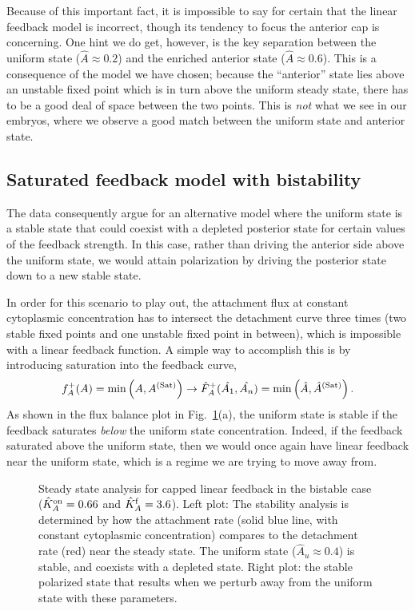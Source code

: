 \documentclass[11pt]{article}
\newcommand{\6}[1]{#1_{\text{6}}}
\newcommand{\3}[1]{#1_{\text{3}}}
\newcommand{\Sat}[1]{#1^\text{(Sat)}}
\begin{document}
Because of this important fact, it is impossible to say for certain that the linear feedback model is incorrect, though its tendency to focus the anterior cap is concerning. One hint we do get, however, is the key separation between the uniform state ($\hat A \approx 0.2$) and the enriched anterior state ($\hat A \approx 0.6$). This is a consequence of the model we have chosen; because the ``anterior'' state lies above an unstable fixed point which is in turn above the uniform steady state, there has to be a good deal of space between the two points. This is \emph{not} what we see in our embryos, where we observe a good match between the uniform state and anterior state.

\subsection{Saturated feedback model with bistability}
The data consequently argue for an alternative model where the uniform state is a stable state that could coexist with a depleted posterior state for certain values of the feedback strength. In this case, rather than driving the anterior side above the uniform state, we would attain polarization by driving the posterior state down to a new stable state. 

In order for this scenario to play out, the attachment flux at constant cytoplasmic concentration has to intersect the detachment curve three times (two stable fixed points and one unstable fixed point in between), which is impossible with a linear feedback function. A simple way to accomplish this is by introducing saturation into the feedback curve,
\begin{equation}
\label{eq:FBmodel}
f_A^+(A) =\min\left(A,\Sat{A}\right) \rightarrow \hat F_A^+(\hat \MA, \hat \PA) = \min\left(\hat A, \Sat{\hat A}\right). 
\end{equation}
As shown in the flux balance plot in Fig.\ \ref{fig:P3Cap}(a), the uniform state is stable if the feedback saturates \emph{below} the uniform state concentration. Indeed, if the feedback saturated above the uniform state, then we would once again have linear feedback near the uniform state, which is a regime we are trying to move away from.

\begin{figure}
\centering
{}
\caption{\label{fig:P3Cap}Steady state analysis for capped linear feedback in the bistable case ($\hat{K}^\text{on}_A=0.66$ and $\hat{K}^\text{f}_A=3.6$). Left plot: The stability analysis is determined by how the attachment rate (solid blue line, with constant cytoplasmic concentration) compares to the detachment rate (red) near the steady state. The uniform state ($\hat A_u \approx 0.4$) is stable, and coexists with a depleted state. Right plot: the stable polarized state that results when we perturb away from the uniform state with these parameters.}
\end{figure}
\end{document}
